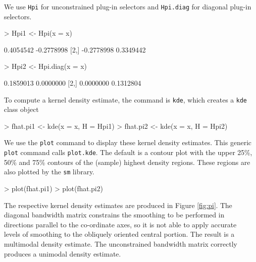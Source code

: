 \documentclass[a4paper,11pt]{article}
\let\code=\texttt
\let\pkg=\texttt
\begin{document}
We use \code{Hpi} for 
unconstrained plug-in selectors and \code{Hpi.diag} for diagonal plug-in selectors.
\begin{Schunk}
\begin{Sinput}
> Hpi1 <- Hpi(x = x)
\end{Sinput}
\begin{Soutput}
           [,1]       [,2]
[1,]  0.4054542 -0.2778998
[2,] -0.2778998  0.3349442
\end{Soutput}
\begin{Sinput}
> Hpi2 <- Hpi.diag(x = x)
\end{Sinput}
\begin{Soutput}
          [,1]      [,2]
[1,] 0.1859013 0.0000000
[2,] 0.0000000 0.1312804
\end{Soutput}
\end{Schunk}
To compute a kernel density estimate, the 
command is \code{kde}, which creates a \code{kde} class object
\begin{Schunk}
\begin{Sinput}
> fhat.pi1 <- kde(x = x, H = Hpi1)
> fhat.pi2 <- kde(x = x, H = Hpi2)
\end{Sinput}
\end{Schunk}
We use the \code{plot} command to display these
kernel density estimates. This generic \code{plot} command calls  
\code{plot.kde}. The default is a contour plot with 
the upper 25\%, 50\% and 75\% contours of the 
(sample) highest density regions. %
These regions are also plotted by the \pkg{sm} library.
\begin{Schunk}
\begin{Sinput}
> plot(fhat.pi1)
> plot(fhat.pi2)
\end{Sinput}
\end{Schunk}
The respective kernel density estimates are produced in Figure \ref{fig:pi}.
The diagonal bandwidth matrix constrains the smoothing to be performed in directions
parallel to the co-ordinate axes, so it is not able to apply accurate levels
of smoothing to the obliquely oriented central portion. The result is a 
multimodal
density estimate. The unconstrained bandwidth matrix correctly produces 
a unimodal density estimate. 
\end{document}
